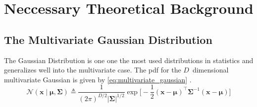 \chapter{Neccessary Theoretical Background}\label{chap:theory}

\section{The Multivariate Gaussian Distribution}
The Gaussian Distribution is one one the most used distributions in statistics \cite{murphy} and generalizes well into the multivariate case. The pdf for the $D$ dimensional multivariate Gaussian is given by \cref{eq:multivariate_gaussian} \cite{murphy}.
\begin{equation}\label{eq:multivariate_gaussian}
    \mathcal{N}(\boldsymbol{x} \; | \; \boldsymbol{\mu}, \boldsymbol{\Sigma}) \triangleq \frac{1}{(2 \pi)^{D/2} |\boldsymbol{\Sigma} | ^{1/2}} \exp \bigg[- \frac{1}{2} (\boldsymbol{x} - \boldsymbol{\mu})^\intercal \boldsymbol{\Sigma}^{-1}(\boldsymbol{x} - \boldsymbol{\mu})\bigg]
\end{equation}
